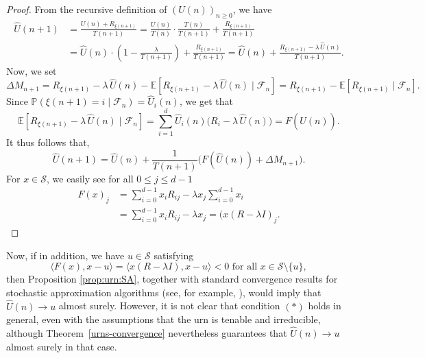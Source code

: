 \documentclass[12pt]{amsart}
\theoremstyle{definition}
\theoremstyle{remark}
\begin{document}
\begin{proof}
From the recursive definition of $(U(n))_{n \geq 0}$, we have
\begin{align*}
    \hat{U}(n+1)
    &= \frac{U(n) +R_{\xi(n+1)}}{T(n+1)}
     = \frac{U(n)}{T(n)} \cdot \frac{T(n)}{T(n+1)} + \frac{R_{\xi(n+1)}}{T(n+1)} \\[6pt]
    &= \hat{U}(n) \cdot \left(1 - \frac{\lambda}{T(n+1)}\right)
       + \frac{R_{\xi(n+1)}}{T(n+1)}
       =\hat{U}(n)+ \frac{R_{\xi(n+1)} - \lambda\,\hat{U}(n)}{T(n+1)}.
\end{align*}
Now, we set
\[
    \Delta M_{n+1}
    = R_{\xi(n+1)} - \lambda\,\hat{U}(n)
      - \mathbb{E}\!\left[R_{\xi(n+1)} - \lambda\,\hat{U}(n)\mid \mathcal{F}_n\right]=R_{\xi(n+1)} 
      - \mathbb{E}\!\left[R_{\xi(n+1)} \mid \mathcal{F}_n\right].
\]
Since $\mathbb{P}(\xi(n+1) = i \mid \mathcal{F}_n) = \hat{U}_i(n)$, we get that
\[
    \mathbb{E}\!\left[R_{\xi(n+1)} - \lambda\,\hat{U}(n)
    \mid \mathcal{F}_n\right]
    = \sum_{i=1}^{d} \hat{U}_i(n)\bigl(R_i - \lambda\,\hat{U}(n)\bigr)=F(\hat{U}(n)).
\]
It thus follows that,
\[
    \hat{U}(n+1) = \hat{U}(n) + \frac{1}{T(n+1)}\bigl(F(\hat{U}(n)) + \Delta M_{n+1}\bigr).
\]
For $x \in \mathcal{S}$, we easily see for all $0\leq j\leq d-1$
\begin{align*}
    F(x)_j&= \sum_{i=0}^{d-1}x_iR_{ij}-\lambda x_j\sum_{i=0}^{d-1}x_i\\
    &=\sum_{i=0}^{d-1}x_iR_{ij}-\lambda x_j=(x(R-\lambda I)_j.
\end{align*}
\end{proof}
Now, if in addition, we have $u \in \mathcal{S}$ satisfying
\begin{equation*}
\langle F(x),x-u\rangle = \langle x(R-\lambda I),x-u\rangle  <0 \text{ for all } x\in \mathcal{S}\setminus\{u\}, \tag{$*$}
\end{equation*}
then Proposition \ref{prop:urn:SA}, together with standard convergence results for stochastic approximation algorithms (see, for example, \cite[Theorem 1.4.26]{Duflo97}), would imply that $\hat{U}(n)\to u$ almost surely. However, it is not clear that condition $(*)$ holds in general, even with the assumptions that the urn is tenable and irreducible, although Theorem~\ref{urns-convergence} nevertheless guarantees that $\hat{U}(n)\to u$ almost surely in that case.
\end{document}

